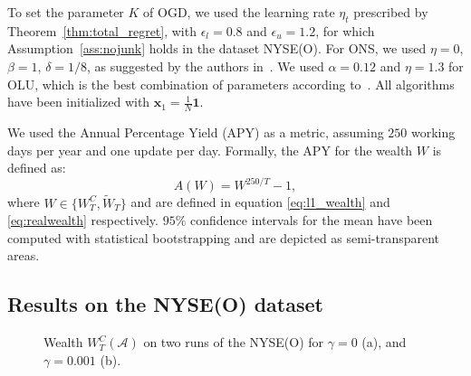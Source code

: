 To set the parameter $K$ of OGD, we used the learning rate $\eta_t$ prescribed by Theorem~\ref{thm:total_regret}, with $\epsilon_l = 0.8$ and $\epsilon_u = 1.2$, for which Assumption~\ref{ass:nojunk} holds in the dataset NYSE(O).
For ONS, we used $\eta = 0$, $\beta = 1$, $\delta = 1/8$, as suggested by the authors in~\cite{agarwal2006algorithms}.
We used $\alpha = 0.12$ and $\eta = 1.3$ for OLU, which is the best combination of parameters according to~\cite{das2013online}.
All algorithms have been initialized with $\mathbf{x}_1 = \frac{1}{N} \mathbf{1}$.

We used the Annual Percentage Yield (APY) as a metric, assuming $250$ working days per year and one update per day.
Formally, the APY for the wealth $W$ is defined as:
\begin{equation*}
    A(W) = W^{250/T} - 1,
\end{equation*}
where $W \in \{ W_T^C, \tilde W_T \}$ and are defined in equation \eqref{eq:l1_wealth} and \eqref{eq:realwealth} respectively.
$95\%$ confidence intervals for the mean have been computed with statistical bootstrapping and are depicted as semi-transparent areas.

\subsection{Results on the NYSE(O) dataset}

\begin{figure}[ht!]
    \centering
\caption{Wealth $W_T^C(\mathcal{A})$ on two runs of the NYSE(O) for $\gamma = 0$ (a), and $\gamma = 0.001$ (b).} \label{fig:algo_copmarison}
\end{figure}

